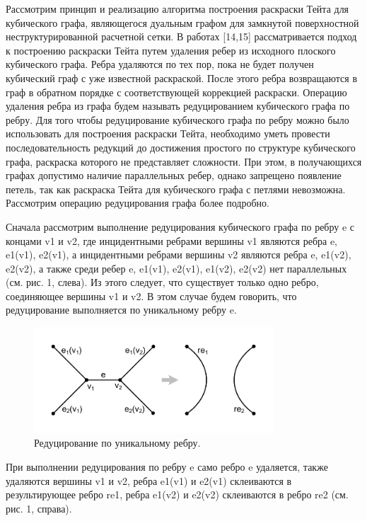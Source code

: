 Рассмотрим принцип и реализацию алгоритма построения раскраски Тейта для кубического графа, являющегося дуальным графом для замкнутой поверхностной неструктурированной расчетной сетки.
В работах [14,15] рассматривается подход к построению раскраски Тейта путем удаления ребер из исходного плоского кубического графа.
Ребра удаляются по тех пор, пока не будет получен кубический граф с уже известной раскраской.
После этого ребра возвращаются в граф в обратном порядке с соответствующей коррекцией раскраски. Операцию удаления ребра из графа будем называть редуцированием кубического графа по ребру.
Для того чтобы редуцирование кубического графа по ребру можно было использовать для построения раскраски Тейта, необходимо уметь провести последовательность редукций до достижения простого по структуре кубического графа, раскраска которого не представляет сложности.
При этом, в получающихся графах допустимо наличие параллельных ребер, однако запрещено появление петель, так как раскраска Тейта для кубического графа с петлями невозможна. Рассмотрим операцию редуцирования графа более подробно.

Сначала рассмотрим выполнение редуцирования кубического графа по ребру e с концами v1 и v2, где инцидентными ребрами вершины v1 являются ребра e, e1(v1), e2(v1), а инцидентными ребрами вершины v2 являются ребра e, e1(v2), e2(v2), а также среди ребер e, e1(v1), e2(v1), e1(v2), e2(v2) нет параллельных (см. рис. 1, слева).
Из этого следует, что существует только одно ребро, соединяющее вершины v1 и v2. В этом случае будем говорить, что редуцирование выполняется по уникальному ребру e.

\begin{figure}[ht]
\centering
\includegraphics[width=0.8\textwidth]{./pics/text_3_edge_coloring/1-pic-reduce-edge-type-1.pdf}
\singlespacing
{}\caption{Редуцирование по уникальному ребру.}
\label{fig:text_3_edge_coloring_1}
\end{figure}

При выполнении редуцирования по ребру e само ребро e удаляется, также удаляются вершины v1 и v2, ребра e1(v1) и e2(v1) склеиваются в результирующее ребро re1, ребра e1(v2) и e2(v2) склеиваются в ребро re2 (см. рис. 1, справа).

